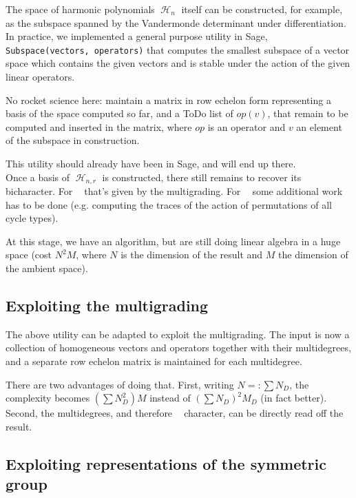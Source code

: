 \documentclass[letter,12pt]{article}
\newcommand{\nicolas}[1]{\todo[linecolor=green,backgroundcolor=green!25,bordercolor=green]{#1}}
\DeclareMathOperator{\Sn}{\mathbb{S}_n}
\DeclareMathOperator{\GLr}{GL_r}
\DeclareMathOperator{\harmonics}{\mathcal{H}}
\begin{document}
	The space of harmonic polynomials $\harmonics_n$ itself can be constructed, for example, as the subspace spanned by the Vandermonde determinant under differentiation. \\
	
	In practice, we implemented a general purpose utility in Sage, \texttt{Subspace(vectors, operators)} that computes the smallest subspace of a vector space which contains the given vectors and is stable under the action of the given linear operators.
	\nicolas{put an example here}
	
	No rocket science here: maintain a matrix in row echelon form representing a basis of the space computed so far, and a ToDo list of $op(v)$, that remain to be computed and inserted in the matrix, where $op$ is an operator and $v$ an element of the subspace in construction.
	
	This utility should already have been in Sage, and will end up there. \\
	
	Once a basis of $\harmonics_{n,r}$ is constructed, there still remains to recover its bicharacter. For $\GLr$ that's given by the multigrading. For $\Sn$ some additional work has to be done (e.g. computing the traces of the action of permutations of all cycle types).
	
	At this stage, we have an algorithm, but are still doing linear algebra in a huge space (cost $N^2 M$, where $N$ is the dimension of the result and $M$ the dimension of the ambient space).
	
	\subsection{Exploiting the multigrading}
	
	The above utility can be adapted to exploit the multigrading. The input is now a collection of homogeneous vectors and operators together with their multidegrees, and a separate row echelon matrix is maintained for each multidegree.
	
	There are two advantages of doing that. 
	First, writing $N=:\sum N_D$, the complexity becomes $(\sum N_D^2) M$ instead of $(\sum N_D)^2M_D$ (in fact better).
	Second, the multidegrees, and therefore $\GLr$ character, can be directly read off the result.
	
	\subsection{Exploiting representations of the symmetric group}
	
\end{document}
